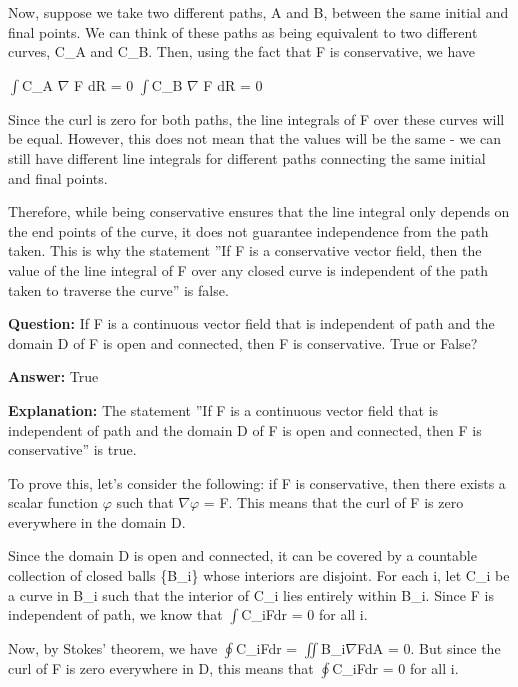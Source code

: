 \documentclass{article}
\begin{document}
Now, suppose we take two different paths, A and B, between the same initial and final points. We can think of these paths as being equivalent to two different curves, C\_A and C\_B. Then, using the fact that F is conservative, we have

\ensuremath{\int}C\_A \ensuremath{\nabla} {\texttimes} F {\textperiodcentered} dR = 0
\ensuremath{\int}C\_B \ensuremath{\nabla} {\texttimes} F {\textperiodcentered} dR = 0

Since the curl is zero for both paths, the line integrals of F over these curves will be equal. However, this does not mean that the values will be the same - we can still have different line integrals for different paths connecting the same initial and final points.

Therefore, while being conservative ensures that the line integral only depends on the end points of the curve, it does not guarantee independence from the path taken. This is why the statement ''If F is a conservative vector field, then the value of the line integral of F over any closed curve is independent of the path taken to traverse the curve'' is false.
                
                \vspace{0.5cm} 
        
            
                \textbf {Question:} If F is a continuous vector field that is independent of path and the domain D of F is open and connected, then F is conservative. True or False?
                
                \textbf{Answer:} True

                \textbf{Explanation:} The statement ''If F is a continuous vector field that is independent of path and the domain D of F is open and connected, then F is conservative'' is true.

To prove this, let's consider the following: if F is conservative, then there exists a scalar function \ensuremath{\varphi} such that \ensuremath{\nabla}\ensuremath{\varphi} = F. This means that the curl of F is zero everywhere in the domain D.

Since the domain D is open and connected, it can be covered by a countable collection of closed balls \{B\_i\} whose interiors are disjoint. For each i, let C\_i be a curve in B\_i such that the interior of C\_i lies entirely within B\_i. Since F is independent of path, we know that \ensuremath{\int}C\_iF{\textperiodcentered}dr = 0 for all i.

Now, by Stokes' theorem, we have \ensuremath{\oint}C\_iF{\textperiodcentered}dr = \ensuremath{\iint}B\_i\ensuremath{\nabla}{\texttimes}F{\textperiodcentered}dA = 0. But since the curl of F is zero everywhere in D, this means that \ensuremath{\oint}C\_iF{\textperiodcentered}dr = 0 for all i.
\end{document}
